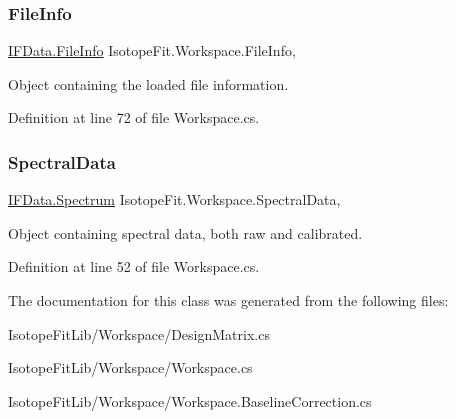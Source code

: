\subsubsection{\texorpdfstring{File\+Info}{FileInfo}}
{\footnotesize\ttfamily \hyperlink{class_isotope_fit_1_1_i_f_data_1_1_file_info}{I\+F\+Data.\+File\+Info} Isotope\+Fit.\+Workspace.\+File\+Info\hspace{0.3cm}{\ttfamily [get]}, {\ttfamily [set]}}



Object containing the loaded file information. 



Definition at line 72 of file Workspace.\+cs.

\mbox{\label{class_isotope_fit_1_1_workspace_a1d6cc2dd07cbfe920da9f1bffc9b32c2}} 
\subsubsection{\texorpdfstring{Spectral\+Data}{SpectralData}}
{\footnotesize\ttfamily \hyperlink{class_isotope_fit_1_1_i_f_data_1_1_spectrum}{I\+F\+Data.\+Spectrum} Isotope\+Fit.\+Workspace.\+Spectral\+Data\hspace{0.3cm}{\ttfamily [get]}, {\ttfamily [set]}}



Object containing spectral data, both raw and calibrated. 



Definition at line 52 of file Workspace.\+cs.



The documentation for this class was generated from the following files\+:\begin{DoxyCompactItemize}
\item 
Isotope\+Fit\+Lib/\+Workspace/Design\+Matrix.\+cs\item 
Isotope\+Fit\+Lib/\+Workspace/Workspace.\+cs\item 
Isotope\+Fit\+Lib/\+Workspace/Workspace.\+Baseline\+Correction.\+cs\end{DoxyCompactItemize}
